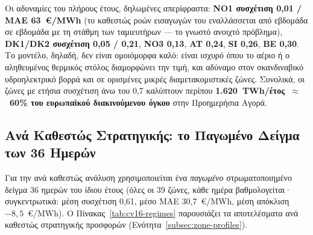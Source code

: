 Οι αδυναμίες του πλήρους έτους, δηλωμένες απερίφραστα: \textbf{NO1 συσχέτιση 0,01 / MAE 63~€/MWh} (το καθεστώς ροών εισαγωγών του εναλλάσσεται από εβδομάδα σε εβδομάδα με τη στάθμη των ταμιευτήρων --- το γνωστό ανοιχτό πρόβλημα), \textbf{DK1/DK2 συσχέτιση 0,05 / 0,21}, \textbf{NO3 0,13}, \textbf{AT 0,24}, \textbf{SI 0,26}, \textbf{BE 0,30}. Το μοντέλο, δηλαδή, δεν είναι ομοιόμορφα καλό: είναι ισχυρό όπου το αέριο ή ο αληθευμένος θερμικός στόλος διαμορφώνει την τιμή, και αδύναμο στον σκανδιναβικό υδροηλεκτρικό βορρά και σε ορισμένες μικρές διαμετακομιστικές ζώνες. Συνολικά, οι ζώνες με ετήσια συσχέτιση άνω του 0,7 καλύπτουν περίπου \textbf{1.620~TWh/έτος~$\approx$~60\% του ευρωπαϊκού διακινούμενου όγκου} στην Προημερήσια Αγορά.

\subsection{Ανά Καθεστώς Στρατηγικής: το Παγωμένο Δείγμα των 36 Ημερών}
\label{subsec:regime-breakdown}

Για την ανά καθεστώς ανάλυση χρησιμοποιείται ένα \emph{παγωμένο} στρωματοποιημένο δείγμα 36 ημερών του ίδιου έτους (όλες οι 39 ζώνες, κάθε ημέρα βαθμολογείται· συγκεντρωτικά: μέση συσχέτιση 0,61, μέσο MAE 30,7~€/MWh, μέση απόκλιση $-8{,}5$~€/MWh). Ο Πίνακας~\ref{tab:cv16-regimes} παρουσιάζει τα αποτελέσματα ανά καθεστώς στρατηγικής προσφορών (Ενότητα~\ref{subsec:zone-profiles}).

